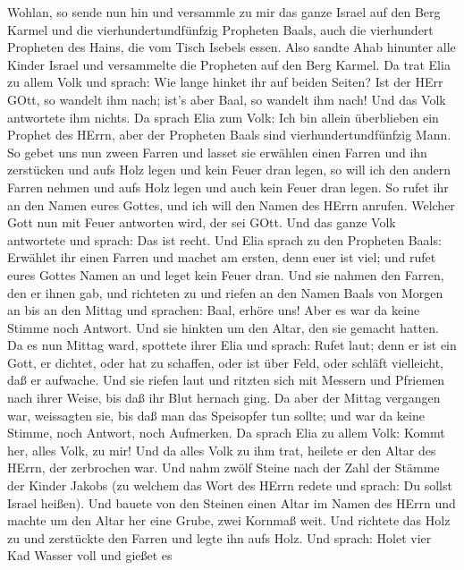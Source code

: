  Wohlan, so sende nun hin und versammle zu mir das ganze
Israel auf den Berg Karmel und die vierhundertundfünfzig Propheten
Baals, auch die vierhundert Propheten des Hains, die vom Tisch Isebels
essen.  Also sandte Ahab hinunter alle Kinder Israel und
versammelte die Propheten auf den Berg Karmel.  Da trat
Elia zu allem Volk und sprach: Wie lange hinket ihr auf beiden Seiten?
Ist der HErr GOtt, so wandelt ihm nach; ist's aber Baal, so wandelt ihm
nach! Und das Volk antwortete ihm nichts.  Da sprach Elia
zum Volk: Ich bin allein überblieben ein Prophet des HErrn, aber der
Propheten Baals sind vierhundertundfünfzig Mann.  So gebet
uns nun zween Farren und lasset sie erwählen einen Farren und ihn
zerstücken und aufs Holz legen und kein Feuer dran legen, so will ich
den andern Farren nehmen und aufs Holz legen und auch kein Feuer dran
legen.  So rufet ihr an den Namen eures Gottes, und ich
will den Namen des HErrn anrufen. Welcher Gott nun mit Feuer antworten
wird, der sei GOtt. Und das ganze Volk antwortete und sprach: Das ist
recht.  Und Elia sprach zu den Propheten Baals: Erwählet
ihr einen Farren und machet am ersten, denn euer ist viel; und rufet
eures Gottes Namen an und leget kein Feuer dran.  Und sie
nahmen den Farren, den er ihnen gab, und richteten zu und riefen an den
Namen Baals von Morgen an bis an den Mittag und sprachen: Baal, erhöre
uns! Aber es war da keine Stimme noch Antwort. Und sie hinkten um den
Altar, den sie gemacht hatten.  Da es nun Mittag ward,
spottete ihrer Elia und sprach: Rufet laut; denn er ist ein Gott, er
dichtet, oder hat zu schaffen, oder ist über Feld, oder schläft
vielleicht, daß er aufwache.  Und sie riefen laut und
ritzten sich mit Messern und Pfriemen nach ihrer Weise, bis daß ihr Blut
hernach ging.  Da aber der Mittag vergangen war, weissagten
sie, bis daß man das Speisopfer tun sollte; und war da keine Stimme,
noch Antwort, noch Aufmerken.  Da sprach Elia zu allem
Volk: Kommt her, alles Volk, zu mir! Und da alles Volk zu ihm trat,
heilete er den Altar des HErrn, der zerbrochen war.  Und
nahm zwölf Steine nach der Zahl der Stämme der Kinder Jakobs (zu welchem
das Wort des HErrn redete und sprach: Du sollst Israel heißen).
 Und bauete von den Steinen einen Altar im Namen des HErrn
und machte um den Altar her eine Grube, zwei Kornmaß weit. 
Und richtete das Holz zu und zerstückte den Farren und legte ihn aufs
Holz.  Und sprach: Holet vier Kad Wasser voll und gießet es
